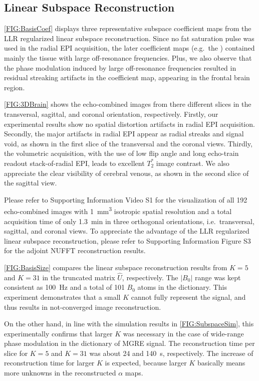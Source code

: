 \documentclass[a4paper,11pt]{article}
\begin{document}
\subsection*{Linear Subspace Reconstruction}

\cref{FIG:BasisCoef} displays three representative subspace coefficient maps 
from the LLR regularized linear subspace reconstruction. 
Since no fat saturation pulse was used in the radial EPI acquisition, 
the later coefficient maps (e.g.~the ) contained mainly the tissue 
with large off-resonance frequencies. 
Plus, we also observe that the phase modulation 
induced by large off-resonance frequencies 
resulted in residual streaking artifacts 
in the  coefficient map, appearing in the frontal brain region.

\cref{FIG:3DBrain} shows the echo-combined images from there different slices 
in the transversal, sagittal, and coronal orientation, respectively.
Firstly, our experimental results show no spatial distortion artifacts 
in radial EPI acquisition. 
Secondly, the major artifacts in radial EPI appear as 
radial streaks and signal void, 
as shown in the first slice of the transversal and the coronal views. 
Thirdly, the volumetric acquisition, 
with the use of low flip angle and long echo-train readout stack-of-radial EPI, 
leads to excellent $T_2^*$ image contrast. 
We also appreciate the clear visibility of cerebral venous, 
as shown in the second slice of the sagittal view.

Please refer to Supporting Information Video S1 
for the visualization of all 192 echo-combined images 
with \SI{1}{\cubic\mm} isotropic spatial resolution and 
a total acquisition time of only \SI{1.3}{\minute} 
in three orthogonal orientations, 
i.e.~transversal, sagittal, and coronal views. 
To appreciate the advantage of the LLR regularized 
linear subspace reconstruction, 
please refer to Supporting Information Figure S3 
for the adjoint NUFFT reconstruction results.

\cref{FIG:BasisSize} compares the linear subspace reconstruction results 
from $K=5$ and $K=31$ in the truncated matrix $\hat{U}$, respectively. 
The $|B_0|$ range was kept consistent as 100~\si{\Hz} and 
a total of 101 $B_0$ atoms in the dictionary. 
This experiment demonstrates that a small $K$ cannot fully represent the signal, 
and thus results in not-converged image reconstruction.

On the other hand, in line with the simulation results in \cref{FIG:SubspaceSim}, 
this experimentally confirms that larger $K$ was necessary 
in the case of wide-range phase modulation in the dictionary of MGRE signal. 
The reconstruction time per slice for $K = 5$ and $K = 31$ 
was about \num{24} and \SI{140}{\second}, respectively. 
The increase of reconstruction time for larger $K$ is expected, 
because larger $K$ basically means more unknowns 
in the reconstructed $\alpha$ maps.
\end{document}
